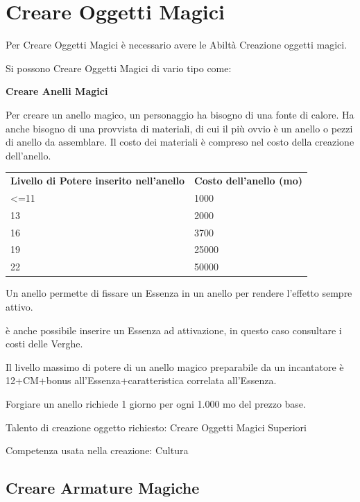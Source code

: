 \documentclass[a4paper,11pt,twoside,openany]{book}
\begin{document}
\pagebreak

\section{Creare Oggetti Magici}

\label{creare-oggetti-magici}

Per Creare Oggetti Magici è necessario avere le Abiltà Creazione oggetti magici.

Si possono Creare Oggetti Magici di vario tipo come:

\bigskip

\textbf{Creare Anelli Magici}

Per creare un anello magico, un personaggio ha bisogno di una fonte di calore. Ha anche bisogno di una provvista di materiali, di cui il più ovvio è un anello o pezzi di anello da assemblare. Il costo dei materiali è compreso nel costo della creazione dell'anello.

\bigskip

\begin{tabular}{ll}
	\toprule
	\textbf{Livello di Potere inserito nell'anello} & \textbf{Costo dell'anello (mo)}\\
	\textless=11    & 1000\\
	13              & 2000\\
	16              & 3700\\
	19              & 25000\\
	22              & 50000\\
\end{tabular}

\bigskip

Un anello permette di fissare un Essenza in un anello per rendere l'effetto sempre attivo.

è anche possibile inserire un Essenza ad attivazione, in questo caso consultare i costi delle Verghe.

Il livello massimo di potere di un anello magico preparabile da un incantatore è 12+CM+bonus all'Essenza+caratteristica correlata all'Essenza.

Forgiare un anello richiede 1 giorno per ogni 1.000 mo del prezzo base.

Talento di creazione oggetto richiesto: Creare Oggetti Magici Superiori

Competenza usata nella creazione: Cultura

\subsection{Creare Armature Magiche}
\end{document}
